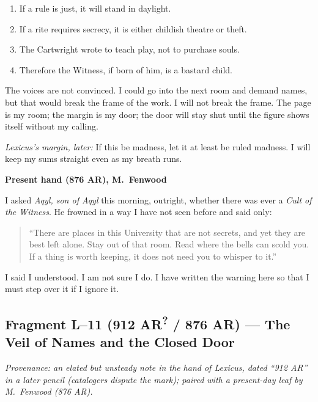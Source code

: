 \documentclass[11pt]{article}
\begin{document}
\begin{enumerate}\setlength\itemsep{0.25em}
  \item If a rule is just, it will stand in daylight.
  \item If a rite requires secrecy, it is either childish theatre or theft.
  \item The Cartwright wrote to teach play, not to purchase souls.
  \item Therefore the Witness, if born of him, is a bastard child.
\end{enumerate}

The voices are not convinced. I could go into the next room and demand names, but that would break the frame of the work. I will not break the frame. The page is my room; the margin is my door; the door will stay shut until the figure shows itself without my calling.

\medskip
\noindent\textit{Lexicus’s margin, later:} If this be madness, let it at least be ruled madness. I will keep my sums straight even as my breath runs.

\medskip
\noindent\textbf{Present hand (876 AR), M.\ Fenwood}

I asked \textit{Aqyl, son of Aqyl} this morning, outright, whether there was ever a \emph{Cult of the Witness}. He frowned in a way I have not seen before and said only:

\begin{quote}\small
``There are places in this University that are not secrets, and yet they are best left alone. Stay out of that room. Read where the bells can scold you. If a thing is worth keeping, it does not need you to whisper to it.''
\end{quote}

I said I understood. I am not sure I do. I have written the warning here so that I must step over it if I ignore it.

\subsection{Fragment L--11 (912 AR\textsuperscript{?} / 876 AR) --- The Veil of Names and the Closed Door}
\label{frag:l11}
{}

\noindent\textit{Provenance: an elated but unsteady note in the hand of Lexicus, dated ``912 AR'' in a later pencil (catalogers dispute the mark); paired with a present-day leaf by M.\ Fenwood (876 AR).}
\end{document}
